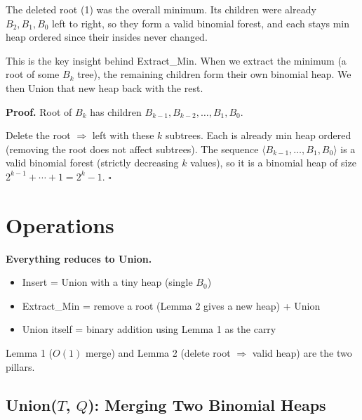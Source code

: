 \documentclass[11pt]{article}
\begin{document}
\begin{examplebox}
\begin{center}
\end{center}

The deleted root (1) was the overall minimum. Its children were already $B_2, B_1, B_0$ left to right, so they form a valid binomial forest, and each stays min heap ordered since their insides never changed.
\end{examplebox}

\begin{keybox}
This is the key insight behind Extract\_Min. When we extract the minimum (a root of some $B_k$ tree), the remaining children form their own binomial heap. We then Union that new heap back with the rest.
\end{keybox}

\textbf{Proof.} Root of $B_k$ has children $B_{k-1}, B_{k-2}, \ldots, B_1, B_0$.

Delete the root $\Rightarrow$ left with these $k$ subtrees. Each is already min heap ordered (removing the root does not affect subtrees). The sequence $\langle B_{k-1}, \ldots, B_1, B_0 \rangle$ is a valid binomial forest (strictly decreasing $k$ values), so it is a binomial heap of size $2^{k-1} + \cdots + 1 = 2^k - 1$. \hfill $\square$

\section{Operations}

\begin{keybox}
\textbf{Everything reduces to Union.}
\begin{itemize}[leftmargin=1.4em,itemsep=2pt]
  \item Insert = Union with a tiny heap (single $B_0$)
  \item Extract\_Min = remove a root (Lemma 2 gives a new heap) + Union
  \item Union itself = binary addition using Lemma 1 as the carry
\end{itemize}
Lemma 1 ($O(1)$ merge) and Lemma 2 (delete root $\Rightarrow$ valid heap) are the two pillars.
\end{keybox}

\subsection{Union($T$, $Q$): Merging Two Binomial Heaps}
\end{document}
